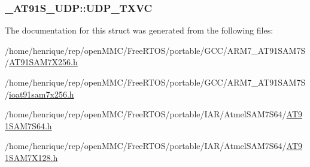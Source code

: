 \hypertarget{struct__AT91S__UDP_af4a766ffccdbe79e17f95783df644e03}{
\subsubsection[{U\-D\-P\-\_\-\-T\-X\-V\-C}]{ \-\_\-\-A\-T91\-S\-\_\-\-U\-D\-P\-::\-U\-D\-P\-\_\-\-T\-X\-V\-C}}\label{struct__AT91S__UDP_af4a766ffccdbe79e17f95783df644e03}


The documentation for this struct was generated from the following files\-:\begin{DoxyCompactItemize}
\item 
/home/henrique/rep/open\-M\-M\-C/\-Free\-R\-T\-O\-S/portable/\-G\-C\-C/\-A\-R\-M7\-\_\-\-A\-T91\-S\-A\-M7\-S/\hyperlink{GCC_2ARM7__AT91SAM7S_2AT91SAM7X256_8h}{A\-T91\-S\-A\-M7\-X256.\-h}\item 
/home/henrique/rep/open\-M\-M\-C/\-Free\-R\-T\-O\-S/portable/\-G\-C\-C/\-A\-R\-M7\-\_\-\-A\-T91\-S\-A\-M7\-S/\hyperlink{ioat91sam7x256_8h}{ioat91sam7x256.\-h}\item 
/home/henrique/rep/open\-M\-M\-C/\-Free\-R\-T\-O\-S/portable/\-I\-A\-R/\-Atmel\-S\-A\-M7\-S64/\hyperlink{AT91SAM7S64_8h}{A\-T91\-S\-A\-M7\-S64.\-h}\item 
/home/henrique/rep/open\-M\-M\-C/\-Free\-R\-T\-O\-S/portable/\-I\-A\-R/\-Atmel\-S\-A\-M7\-S64/\hyperlink{AT91SAM7X128_8h}{A\-T91\-S\-A\-M7\-X128.\-h}\end{DoxyCompactItemize}
